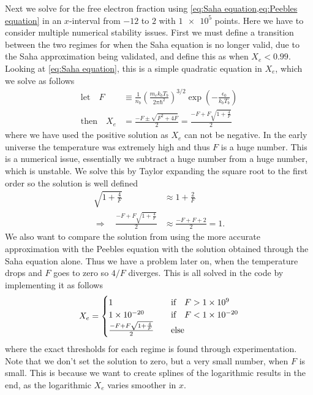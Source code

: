\documentclass[10pt,a4paper]{article}
\begin{document}
Next we solve for the free electron fraction using \cref{eq:Saha equation,eq:Peebles equation} in an $x$-interval from $-12$ to $2$ with $\num{1e5}$ points. Here we have to consider multiple numerical stability issues. First we must define a transition between the two regimes for when the Saha equation is no longer valid, due to the Saha approximation being validated, and define this as when $X_e < 0.99$. Looking at \cref{eq:Saha equation}, this is a simple quadratic equation in $X_e$, which we solve as follows
\begin{align*}
    \text{let} \quad  F &\equiv \frac{1}{n_b}\left(\frac{m_e k_b T_b}{2\pi \hbar^2}\right)^{3/2} \exp(-\frac{\epsilon_0}{k_b T_b})
    \\
    \text{then} \quad X_e &= \frac{-F \pm \sqrt{F^2 + 4F}}{2} = \frac{-F + F\sqrt{1+\frac{4}{F}}}{2}
\end{align*}
where we have used the positive solution as $X_e$ can not be negative. In the early universe the temperature was extremely high and thus $F$ is a huge number. This is a numerical issue, essentially we subtract a huge number from a huge number, which is unstable. We solve this by Taylor expanding the square root to the first order so the solution is well defined
\begin{align*}
    \sqrt{1+\frac{4}{F}} &\approx 1+ \frac{2}{F}
    \\
    \Rightarrow \quad \frac{-F + F\sqrt{1+\frac{4}{F}}}{2} &\approx \frac{-F + F +2}{2} = 1.
\end{align*}
We also want to compare the solution from using the more accurate approximation with the Peebles equation with the solution obtained through the Saha equation alone. Thus we have a problem later on, when the temperature drops and $F$ goes to zero so $4/F$ diverges. This is all solved in the code by implementing it as follows
\begin{align*}
    X_e = \begin{cases}
        \num{1} &\qif F > \num{1e9}
        \\
        \num{1e-20} &\qif F < \num{1e-20}
        \\
        \frac{-F + F\sqrt{1+\frac{4}{F}}}{2}  &\quad \text{else}
    \end{cases}
\end{align*}
where the exact thresholds for each regime is found through experimentation. Note that we don't set the solution to zero, but a very small number, when $F$ is small. This is because we want to create splines of the logarithmic results in the end, as the logarithmic $X_e$ varies smoother in $x$.
\end{document}
